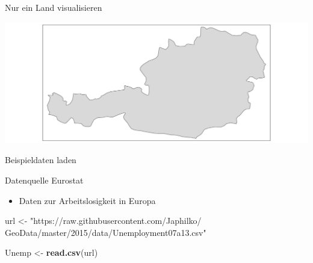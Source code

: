 \documentclass[ignorenonframetext,]{beamer}
\newenvironment{Shaded}{\begin{snugshade}}{\end{snugshade}}
\newcommand{\KeywordTok}[1]{\textcolor[rgb]{0.13,0.29,0.53}{\textbf{#1}}}
\newcommand{\StringTok}[1]{\textcolor[rgb]{0.31,0.60,0.02}{#1}}
\newcommand{\OperatorTok}[1]{\textcolor[rgb]{0.81,0.36,0.00}{\textbf{#1}}}
\newcommand{\NormalTok}[1]{#1}
\providecommand{\tightlist}{%
  \setlength{\itemsep}{0pt}\setlength{\parskip}{0pt}}
\begin{document}
\begin{frame}[fragile]{Nur ein Land visualisieren}

\begin{Shaded}
\end{Shaded}

\includegraphics{slides_all2gether_part1_files/figure-beamer/unnamed-chunk-90-1.pdf}

\end{frame}

\begin{frame}[fragile]{Beispieldaten laden}

\begin{block}{Datenquelle Eurostat}

\begin{itemize}
\tightlist
\item
  Daten zur Arbeitslosigkeit in Europa
\end{itemize}

\begin{Shaded}
\begin{Highlighting}[]
\NormalTok{url <-}\StringTok{ "https://raw.githubusercontent.com/Japhilko/}
\StringTok{GeoData/master/2015/data/Unemployment07a13.csv"}

\NormalTok{Unemp <-}\StringTok{ }\KeywordTok{read.csv}\NormalTok{(url) }
\end{Highlighting}
\end{Shaded}

\end{block}

\end{frame}
\end{document}
